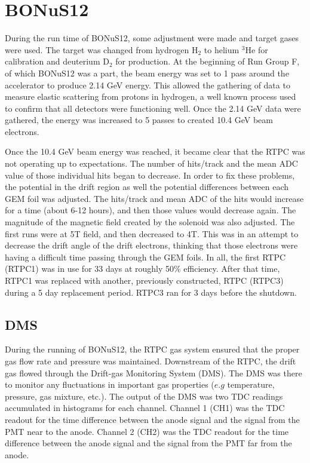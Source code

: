 \cleardoublepage
\section{BONuS12}
During the run time of BONuS12, some adjustment were made and target gases were used. The target was changed from hydrogen H$_2$ to helium $^3$He for calibration and deuterium D$_2$ for production. At the beginning of Run Group F, of which BONuS12 was a part, the beam energy was set to 1 pass around the accelerator to produce 2.14 GeV energy. This allowed the gathering of data to measure elastic scattering from protons in hydrogen, a well known process used to confirm that all detectors were functioning well.  Once the 2.14 GeV data were gathered, the energy was increased to 5 passes to created 10.4 GeV beam electrons.

Once the 10.4 GeV beam energy was reached, it became clear that the RTPC was not operating up to expectations. The number of hits/track and the mean ADC value of those individual hits began to decrease. In order to fix these problems, the potential in the drift region as well the potential differences between each GEM foil was adjusted. The hits/track and mean ADC of the hits would increase for a time (about 6-12 hours), and then those values would decrease again. The magnitude of the magnetic field created by the solenoid was also adjusted. The first runs were at 5T field, and then decreased to 4T. This was in an attempt to decrease the drift angle of the drift electrons, thinking that those electrons were having a difficult time passing through the GEM foils. In all, the first RTPC (RTPC1) was in use for 33 days at roughly 50\% efficiency. After that time, RTPC1 was replaced with another, previously constructed, RTPC (RTPC3) during a 5 day replacement period. RTPC3 ran for 3 days before the shutdown.

\subsection{DMS}
During the running of BONuS12, the RTPC gas system ensured that the proper gas flow rate and pressure was maintained. Downstream of the RTPC, the drift gas flowed through the Drift-gas Monitoring System (DMS). The DMS was there to monitor any fluctuations in important gas properties ($e.g$ temperature, pressure, gas mixture, etc.). The output of the DMS was two TDC readings accumulated in histograms for each channel. Channel 1 (CH1) was the TDC readout for the time difference between the anode signal and the signal from the PMT near to the anode. Channel 2 (CH2) was the TDC readout for the time difference between the anode signal and the signal from the PMT far from the anode.

